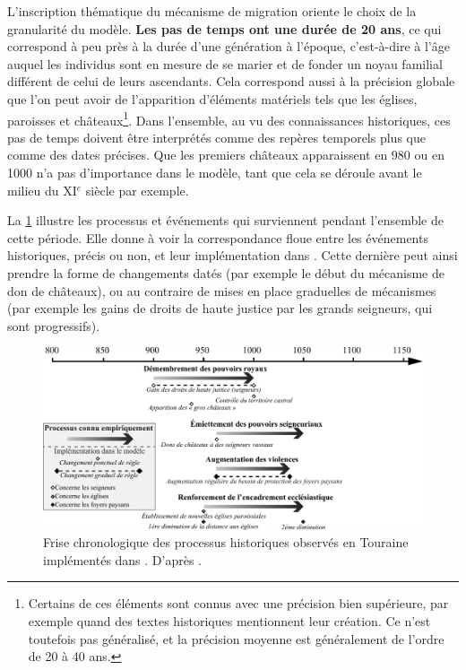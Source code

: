 L'inscription thématique du mécanisme de migration oriente le choix de la granularité du modèle.
\textbf{Les pas de temps ont une durée de 20 ans}, ce qui correspond à peu près à la durée d'une génération à l'époque, c'est-à-dire à l'âge auquel les individus sont en mesure de se marier et de fonder un noyau familial différent de celui de leurs ascendants.
Cela correspond aussi à la précision globale que l'on peut avoir de l'apparition d'éléments matériels tels que les églises, paroisses et châteaux\footnote{
	Certains de ces éléments sont connus avec une précision bien supérieure, par exemple quand des textes historiques mentionnent leur création.
	Ce n'est toutefois pas généralisé, et la précision moyenne est généralement de l'ordre de 20 à 40 ans.
}.
Dans l'ensemble, au vu des connaissances historiques, ces pas de temps doivent être interprétés comme des repères temporels plus que comme des dates précises. 
Que les premiers châteaux apparaissent en 980 ou en 1000 n'a pas d'importance dans le modèle, tant que cela se déroule avant le milieu du XI$^e$ siècle par exemple.

La \cref{fig:frise-chrono} illustre les processus et événements qui surviennent pendant l'ensemble de cette période.
Elle donne à voir la correspondance floue entre les événements historiques, précis ou non, et leur implémentation dans \simfeodal{}.
Cette dernière peut ainsi prendre la forme de changements datés (par exemple le début du mécanisme de don de châteaux), ou au contraire de mises en place graduelles de mécanismes (par exemple les gains de droits de haute justice par les grands seigneurs, qui sont progressifs).

\begin{figure}[H]
	\centering
	\includegraphics[width=\linewidth]{img/frise_chrono_tmd.pdf}
	\caption[Frise chronologique des processus historiques observés en Touraine implémentés dans \simfeodal{}.]{Frise chronologique des processus historiques observés en Touraine implémentés dans \simfeodal{}. D'après \textcite[fig. 2, p.~315]{cura_transition_2017}.}
	\label{fig:frise-chrono}
\end{figure}



